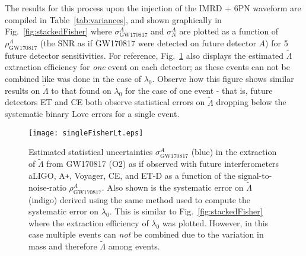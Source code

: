 \documentclass[prd,twocolumn,nofootinbib,superscriptaddress,amsmath,amssymb]{revtex4-1}
\begin{document}
The results for this process upon the injection of the IMRD + 6PN waveform are compiled in Table~\ref{tab:variances}, and shown graphically in Fig.~\ref{fig:stackedFisher} where $\sigma^A_{\text{GW170817}}$ and $\sigma^A_N$ are plotted as a function of $\rho^A_{\text{GW170817}}$ (the SNR as if GW170817 were detected on future detector $A$) for 5 future detector sensitivities.
For reference, Fig.~\ref{fig:singleFisherLt} also displays the estimated $\tilde\Lambda$ extraction efficiency for \emph{one} event on each detector; as these events can not be combined like was done in the case of $\lambda_0$.
Observe how this figure shows similar results on $\tilde\Lambda$ to that found on $\lambda_0$ for the case of one event - that is, future detectors ET and CE both observe statistical errors on $\tilde\Lambda$ dropping below the systematic binary Love errors for a single event.
\begin{figure}
\begin{center} 
\texttt{[image: singleFisherLt.eps]}
\end{center}
\caption{
Estimated statistical uncertainties $\sigma^A_{\text{GW170817}}$ (blue) in the extraction of $\tilde\Lambda$ from GW170817 (O2) as if observed with future interferometers aLIGO, A\texttt{+}, Voyager, CE, and ET-D as a function of the signal-to-noise-ratio $\rho^A_{\text{GW170817}}$.
Also shown is the systematic error on $\tilde\Lambda$ (indigo) derived using the same method used to compute the systematic error on $\lambda_0$.
This is similar to Fig.~\ref{fig:stackedFisher} where the extraction efficiency of $\lambda_0$ was plotted.
However, in this case multiple events can \emph{not} be combined due to the variation in mass and therefore $\tilde\Lambda$ among events.
}
\label{fig:singleFisherLt}
\end{figure} 
\end{document}

